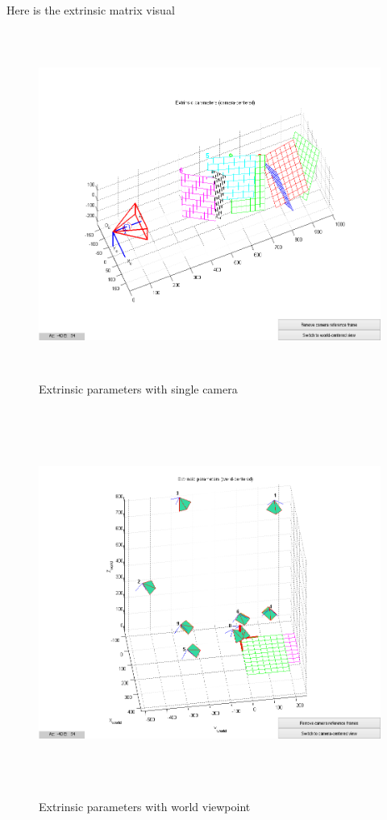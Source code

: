 \documentclass[11pt,psfig]{article}
\begin{document}
Here is the extrinsic matrix visual
\begin{figure}[H]
\centering
\includegraphics[height=4.5in]{prob3plot3.png}
\caption{Extrinsic parameters with single camera}
\end{figure}
\begin{figure}[H]
\centering
\includegraphics[height=5in]{prob3plot4.png}
\caption{Extrinsic parameters with world viewpoint}
\end{figure}
\end{document}
